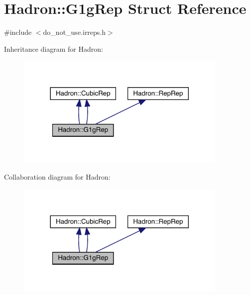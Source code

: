 \hypertarget{structHadron_1_1G1gRep}{}\section{Hadron\+:\+:G1g\+Rep Struct Reference}
\label{structHadron_1_1G1gRep}


{\ttfamily \#include $<$do\+\_\+not\+\_\+use.\+irreps.\+h$>$}



Inheritance diagram for Hadron\+:\nopagebreak
\begin{figure}[H]
\begin{center}
\leavevmode
\includegraphics[width=288pt]{df/d36/structHadron_1_1G1gRep__inherit__graph}
\end{center}
\end{figure}


Collaboration diagram for Hadron\+:\nopagebreak
\begin{figure}[H]
\begin{center}
\leavevmode
\includegraphics[width=288pt]{d9/d78/structHadron_1_1G1gRep__coll__graph}
\end{center}
\end{figure}
